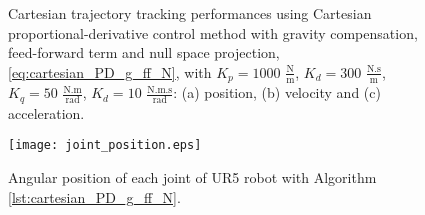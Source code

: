 \begin{figure}%
	\centering
	\caption{Cartesian trajectory tracking performances using Cartesian proportional-derivative control method with gravity compensation, feed-forward term and null space projection, \eqref{eq:cartesian_PD_g_ff_N}, with  ${K_{p}}=1000$ $\mathrm{\frac{N}{m}}$, $K_{d}= 300$ $\mathrm{\frac{N.s}{m}}$, ${K_{q}}=50$ $\mathrm{\frac{N.m}{rad}}$, $K_{d}= 10$ $\mathrm{\frac{N.m.s}{rad}}$: (a) position, (b) velocity and (c) acceleration.}
	\label{fig:act_1.7_ee_position}
\end{figure}

\begin{figure}
    \centering
    \texttt{[image: joint\_position.eps]}	
    \caption{Angular position of each joint of UR5 robot with Algorithm \ref{lst:cartesian_PD_g_ff_N}.}
    \label{fig:act_1.7_joint_position}
\end{figure}
